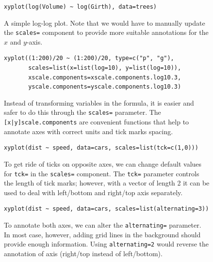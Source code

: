 \documentclass[a4paper,twoside]{book}
\newcounter{fig}
\newcommand{\img}[1]{\texttt{[image: \#1]}\stepcounter{fig}}
\renewcommand{\texttt}[1]{\lstinline{#1}}
\begin{document}
\begin{figure}[H]
\begin{lstlisting}
xyplot(log(Volume) ~ log(Girth), data=trees)
\end{lstlisting}
  \fcapside[\FBwidth] {\img{figs_lattice-crop}}
  {\caption*{
      A simple log-log plot. Note that we would have to manually
      update the \texttt{scales=} component to provide more suitable
      annotations for the $x$ and $y$-axis.}}
\end{figure}

\begin{figure}[H]
\begin{lstlisting}
xyplot((1:200)/20 ~ (1:200)/20, type=c("p", "g"),
       scales=list(x=list(log=10), y=list(log=10)),
       xscale.components=xscale.components.log10.3,
       yscale.components=yscale.components.log10.3)
\end{lstlisting}
  \fcapside[\FBwidth] {\img{figs_lattice-crop}} {\caption*{Instead of
      transforming variables in the formula, it is easier and safer to
      do this through the \texttt{scales=} parameter. The
      \texttt{[x|y]scale.components} are convenient functions that
      help to annotate axes with correct units and tick marks
      spacing.}}
\end{figure}


\begin{figure}[H]
\begin{lstlisting}
xyplot(dist ~ speed, data=cars, scales=list(tck=c(1,0)))
\end{lstlisting}
  \fcapside[\FBwidth] {\img{figs_lattice-crop}} {\caption*{To get ride
      of ticks on opposite axes, we can change default values for
      \texttt{tck=} in the \texttt{scales=} component. The
      \texttt{tck=} parameter controls the length of tick marks;
      however, with a vector of length 2 it can be used to deal with
      left/bottom and right/top axis separately.}}
\end{figure}

\begin{figure}[H]
\begin{lstlisting}
xyplot(dist ~ speed, data=cars, scales=list(alternating=3))
\end{lstlisting}
  \fcapside[\FBwidth] {\img{figs_lattice-crop}} {\caption*{To annotate
      both axes, we can alter the \texttt{alternating=} parameter. In
      most case, however, adding grid lines in the background should
      provide enough information. Using \texttt{alternating=2} would
      reverse the annotation of axis (right/top instead of
      left/bottom).}}
\end{figure}
\end{document}
